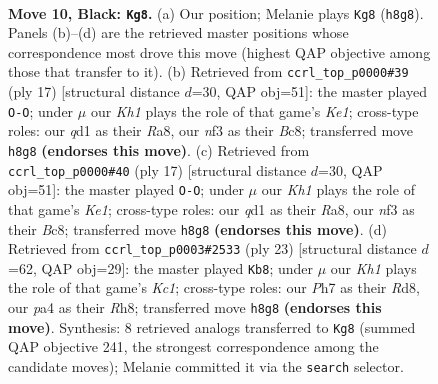 \documentclass[11pt]{article}
\begin{document}
\clearpage

\begin{figure}[p]\centering
\begin{subfigure}{0.46\textwidth}\centering
\resizebox{\linewidth}{!}{%
\newchessgame
\chessboard[
  setfen={r1bq1r1k/p1p2ppp/2pp1n2/4p3/P3P2P/2PP1N2/2P2PP1/R1BQ1RK1 b - - 0 10},
  showmover=false,
  pgfstyle=straightmove, color=movearrow, markmove={h8-g8}
]}
\caption{}
\end{subfigure}\hfill
\begin{subfigure}{0.46\textwidth}\centering
\resizebox{\linewidth}{!}{%
\newchessgame
\chessboard[
  setfen={r1b1k2r/p1p1qppp/2pp1n2/4p3/4P3/2PP1N1P/P1P2PP1/R1BQ1RK1 b kq - 0 9},
  showmover=false,
  pgfstyle=straightmove, color=movearrow, markmove={e8-g8}
]}
\caption{}
\end{subfigure}
\\[4pt]
\begin{subfigure}{0.46\textwidth}\centering
\resizebox{\linewidth}{!}{%
\newchessgame
\chessboard[
  setfen={r1b1k2r/p1p1qppp/2pp1n2/4p3/4P3/2PP1N1P/P1P2PP1/R1BQ1RK1 b kq - 0 9},
  showmover=false,
  pgfstyle=straightmove, color=movearrow, markmove={e8-g8}
]}
\caption{}
\end{subfigure}\hfill
\begin{subfigure}{0.46\textwidth}\centering
\resizebox{\linewidth}{!}{%
\newchessgame
\chessboard[
  setfen={2kr3r/1ppnqppp/p1pb4/4p3/2P1P3/2PP1N2/P4PPP/R1BQ1RK1 b - - 0 12},
  showmover=false,
  pgfstyle=straightmove, color=movearrow, markmove={c8-b8}
]}
\caption{}
\end{subfigure}
\caption{\textbf{Move 10, Black: \texttt{Kg8}.} (a) Our position; Melanie plays \texttt{Kg8} (\texttt{h8g8}). Panels (b)--(d) are the retrieved master positions whose correspondence most drove this move (highest QAP objective among those that transfer to it). (b) Retrieved from \texttt{ccrl\_top\_p0000\#39} (ply 17) [structural distance $d$=30, QAP obj=51]: the master played \texttt{O-O}; under $\mu$ our \emph{Kh1} plays the role of that game's \emph{Ke1}; cross-type roles: our \emph{q}d1 as their \emph{R}a8, our \emph{n}f3 as their \emph{B}c8; transferred move \texttt{h8g8} \textbf{(endorses this move)}. (c) Retrieved from \texttt{ccrl\_top\_p0000\#40} (ply 17) [structural distance $d$=30, QAP obj=51]: the master played \texttt{O-O}; under $\mu$ our \emph{Kh1} plays the role of that game's \emph{Ke1}; cross-type roles: our \emph{q}d1 as their \emph{R}a8, our \emph{n}f3 as their \emph{B}c8; transferred move \texttt{h8g8} \textbf{(endorses this move)}. (d) Retrieved from \texttt{ccrl\_top\_p0003\#2533} (ply 23) [structural distance $d$=62, QAP obj=29]: the master played \texttt{Kb8}; under $\mu$ our \emph{Kh1} plays the role of that game's \emph{Kc1}; cross-type roles: our \emph{P}h7 as their \emph{R}d8, our \emph{p}a4 as their \emph{R}h8; transferred move \texttt{h8g8} \textbf{(endorses this move)}. Synthesis: 8 retrieved analogs transferred to \texttt{Kg8} (summed QAP objective 241, the strongest correspondence among the candidate moves); Melanie committed it via the \texttt{search} selector.}
\label{fig:thought-m19}
\end{figure}
\end{document}
